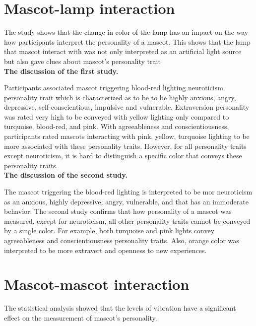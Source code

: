 \section{Mascot-lamp interaction}
\label{sec:mascot-lamp-interaction}
The study shows that the change in color of the lamp has an impact on the way
how participants interpret the personality of a mascot.
This shows that the lamp that mascot interact with was not only interpreted as an
artificial light source but also gave clues about mascot's personality trait\\

\textbf{The discussion of the first study.}\par
Participants associated mascot triggering blood-red lighting neuroticism personality trait
which is characterized as to be to be highly anxious, angry, depressive, self-conscientious, impulsive and vulnerable.
Extraversion personality was rated very high to be conveyed with yellow lighting only compared
to turquoise, blood-red, and pink.
With agreeableness and conscientiousness, participants rated mascots interacting with pink, yellow,
turquoise lighting to be more associated with these personality traits.
However, for all personality traits except neuroticism, it is hard to distinguish
a specific color that conveys these personality traits.\\

\textbf{The discussion of the second study.}\par
The mascot triggering the blood-red lighting is interpreted to be mor neuroticism as an anxious, highly depressive,
angry, vulnerable, and that has an immoderate behavior.
The second study confirms that how personality of a mascot was measured, except
for neuroticism, all other personality traits cannot be conveyed by a single color.
For example, both turquoise and pink lights convey agreeableness and
conscientiousness personality traits.
Also, orange color was interpreted to be more extravert and openness to new experiences.\\


\section{Mascot-mascot interaction}
\label{sec:mascot-mascot-interaction}
The statistical analysis showed that the levels of vibration have a significant effect on the
measurement of mascot's personality.\\

